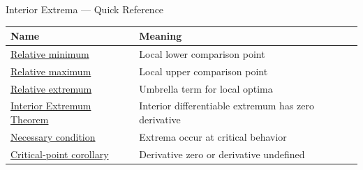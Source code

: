 \begin{toolkitbox}{Interior Extrema --- Quick Reference}
\small
\begin{tabular}{l l}
\toprule
\textbf{Name} & \textbf{Meaning} \\
\midrule
\hyperref[def:relative-minimum]{Relative minimum} & Local lower comparison point \\
\hyperref[def:relative-maximum]{Relative maximum} & Local upper comparison point \\
\hyperref[def:relative-extremum]{Relative extremum} & Umbrella term for local optima \\
\hyperref[thm:interior-extremum-theorem]{Interior Extremum Theorem} & Interior differentiable extremum has zero derivative \\
\hyperref[thm:necessary-condition-extremum]{Necessary condition} & Extrema occur at critical behavior \\
\hyperref[cor:relative-extremum-necessary-condition]{Critical-point corollary} & Derivative zero or derivative undefined \\
\bottomrule
\end{tabular}
\end{toolkitbox}


